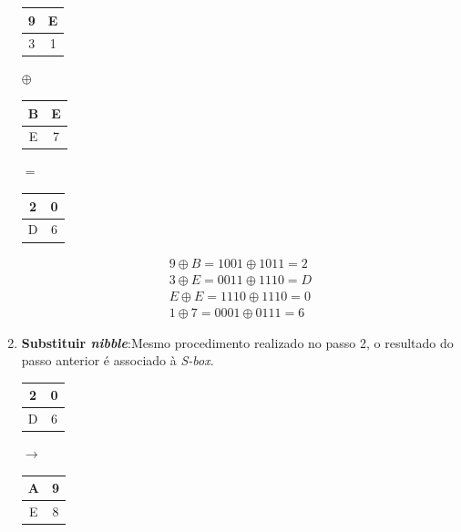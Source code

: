 \documentclass{article}
\begin{document}
\begin{enumerate}
    \begin{center}
        \begin{tabular}{|c|c|}
            \hline
            9 & E  \\
            \hline
            3 & 1 \\
            \hline
        \end{tabular}
        $\oplus$
        \begin{tabular}{|c|c|}
            \hline
            B & E  \\
            \hline
            E & 7 \\
            \hline
        \end{tabular}
        $=$
        \begin{tabular}{|c|c|}
            \hline
            2 & 0  \\
            \hline
            D & 6 \\
            \hline
        \end{tabular}
    \end{center}
    \begin{gather*}
        9 \oplus B = 1001 \oplus 1011 = 2 \\
        3 \oplus E = 0011 \oplus 1110 = D \\
        E \oplus E = 1110 \oplus 1110 = 0 \\
        1 \oplus 7 = 0001 \oplus 0111 = 6
    \end{gather*}
    
    \item \textbf{Substituir \textit{nibble}}:Mesmo procedimento realizado no
    passo 2, o resultado do passo anterior é associado à \textit{S-box}.
    \begin{center}
        \begin{tabular}{|c|c|}
            \hline
            2 & 0  \\
            \hline
            D & 6 \\
            \hline
        \end{tabular}
        $\to$
        \begin{tabular}{|c|c|}
            \hline
            A & 9  \\
            \hline
            E & 8 \\
            \hline
        \end{tabular}
    \end{center}
    

\end{enumerate}
\end{document}
